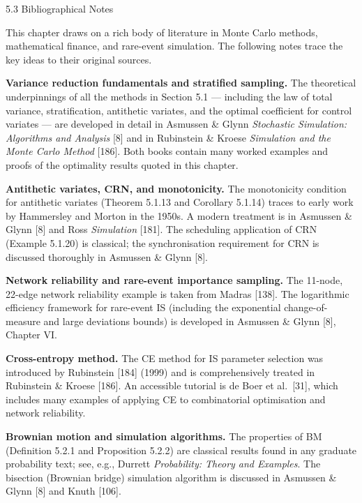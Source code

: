 \documentclass[aspectratio=169,10pt]{beamer}
\begin{document}
\begin{frame}[allowframebreaks]{5.3 Bibliographical Notes}

This chapter draws on a rich body of literature in Monte Carlo methods,
mathematical finance, and rare-event simulation.  The following notes trace the
key ideas to their original sources.

\textbf{Variance reduction fundamentals and stratified sampling.}
The theoretical underpinnings of all the methods in Section 5.1 --- including
the law of total variance, stratification, antithetic variates, and the optimal
coefficient for control variates --- are developed in detail in Asmussen \&
Glynn \emph{Stochastic Simulation: Algorithms and Analysis} [8] and in
Rubinstein \& Kroese \emph{Simulation and the Monte Carlo Method} [186].
Both books contain many worked examples and proofs of the optimality results
quoted in this chapter.

\textbf{Antithetic variates, CRN, and monotonicity.}
The monotonicity condition for antithetic variates (Theorem 5.1.13 and
Corollary 5.1.14) traces to early work by Hammersley and Morton in the
1950s.  A modern treatment is in Asmussen \& Glynn [8] and Ross
\emph{Simulation} [181].  The scheduling application of CRN (Example 5.1.20)
is classical; the synchronisation requirement for CRN is discussed thoroughly
in Asmussen \& Glynn [8].

\framebreak

\textbf{Network reliability and rare-event importance sampling.}
The 11-node, 22-edge network reliability example is taken from Madras [138].
The logarithmic efficiency framework for rare-event IS (including the
exponential change-of-measure and large deviations bounds) is developed in
Asmussen \& Glynn [8], Chapter VI.

\textbf{Cross-entropy method.}
The CE method for IS parameter selection was introduced by Rubinstein [184]
(1999) and is comprehensively treated in Rubinstein \& Kroese [186].
An accessible tutorial is de Boer et al.\ [31], which includes many examples
of applying CE to combinatorial optimisation and network reliability.

\textbf{Brownian motion and simulation algorithms.}
The properties of BM (Definition 5.2.1 and Proposition 5.2.2) are classical
results found in any graduate probability text; see, e.g., Durrett
\emph{Probability: Theory and Examples}.  The bisection (Brownian bridge)
simulation algorithm is discussed in Asmussen \& Glynn [8] and Knuth [106].


\end{frame}
\end{document}
